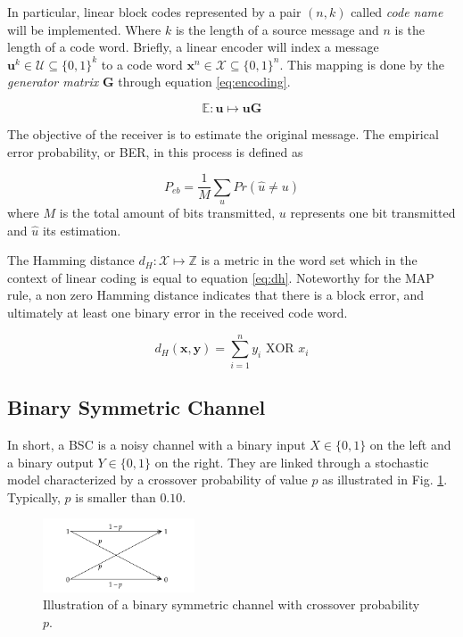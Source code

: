 \documentclass[conference]{IEEEtran}
\begin{document}
In particular, linear block codes represented by a pair $(n, k)$ called \textit{code name} will be implemented. Where $k$ is the length of a source message and $n$ is the length of a code word. Briefly, a linear encoder will index a message $\textbf{u}^k \in \mathcal{U} \subseteq \{0,1\}^k$ to a code word $\textbf{x}^n \in \mathcal{X} \subseteq \{0,1\}^n$. This mapping is done by the \textit{generator matrix} $ \textbf{G} $ through equation \ref{eq:encoding}.

\begin{equation}\label{eq:encoding}
\mathbb{E}:\textbf{u} \mapsto \textbf{uG}
\end{equation}

The objective of the receiver is to estimate the original message. The empirical error probability, or BER, in this process is defined as

\begin{equation}
P_{eb} = \frac{1}{M} \underset{u}{\sum}Pr(\hat{u}\neq u)
\end{equation}
where $M$ is the total amount of bits transmitted, $u$ represents one bit transmitted and $\hat{u}$ its estimation.

The Hamming distance $d_H:\mathcal{X}\mapsto \mathbb{Z}$ is a metric in the word set which in the context of linear coding is equal to equation \ref{eq:dh}. Noteworthy for the MAP rule, a non zero Hamming distance indicates that there is a block error, and ultimately at least one binary error in the received code word.

\begin{equation}\label{eq:dh}
d_H(\textbf{x},\textbf{y}) = \sum_{i=1}^{n} y_i \text{ XOR } x_i 
\end{equation}  

\subsection{Binary Symmetric Channel}

In short, a BSC is a noisy channel with a binary input $X\in \{0,1\}$ on the left and a binary output $Y\in \{0,1\}$ on the right. They are linked through a stochastic model characterized by a crossover probability of value $p$ as illustrated in Fig. \ref{fig:BSC}. Typically, $p$ is smaller than $0.10$.


\begin{figure}[!ht]
  \centering
    \includegraphics[width=0.4\textwidth]{images/BSC}
    \caption{Illustration of a binary symmetric channel with crossover probability $p$.}\label{fig:BSC}
\end{figure}
\end{document}
